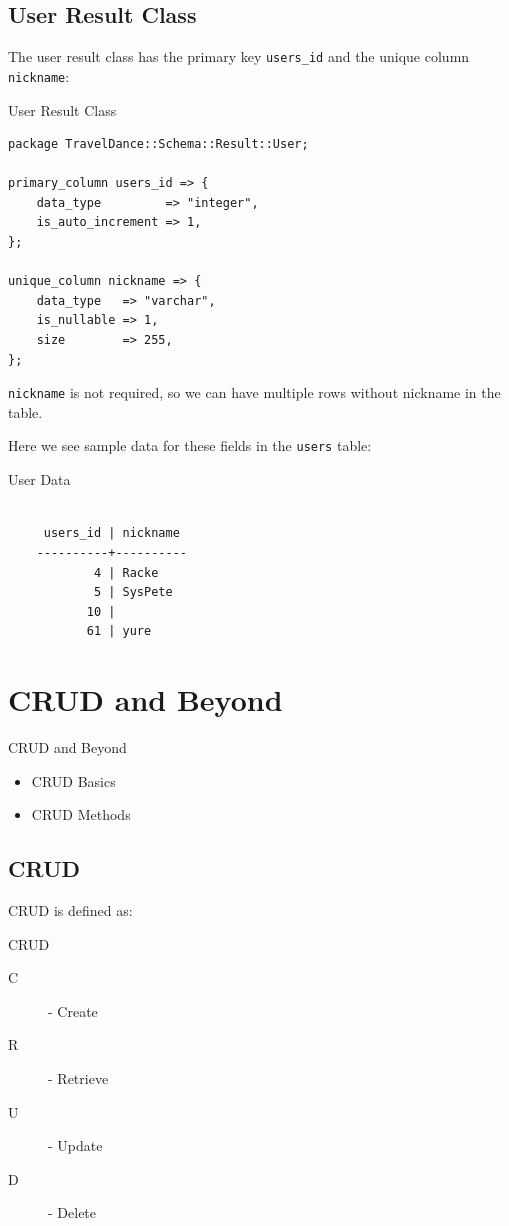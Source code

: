 \subsection{User Result Class}

The user result class has the primary key \verb|users_id| and the
unique column \verb|nickname|:

\begin{frame}[fragile]{User Result Class}
\begin{lstlisting}
package TravelDance::Schema::Result::User;

primary_column users_id => {
    data_type         => "integer",
    is_auto_increment => 1,
};

unique_column nickname => {
    data_type   => "varchar",
    is_nullable => 1,
    size        => 255,
};
\end{lstlisting}
\end{frame}

\verb|nickname| is not required, so we can have multiple
rows without nickname in the table.

Here we see sample data for these fields in the
\verb|users| table:

\begin{frame}[fragile]{User Data}
\begin{lstlisting}

     users_id | nickname
    ----------+----------
            4 | Racke
            5 | SysPete
           10 |
           61 | yure

\end{lstlisting}
\end{frame}

\section{CRUD and Beyond}
\begin{frame}{CRUD and Beyond}
\begin{itemize}
\item CRUD Basics
\item CRUD Methods
\end{itemize}
\end{frame}

\subsection{CRUD}

CRUD is defined as:

\begin{frame}{CRUD}
\begin{description}
\item[C] - Create
\item[R] - Retrieve
\item[U] - Update
\item[D] - Delete
\end{description}
\end{frame}

